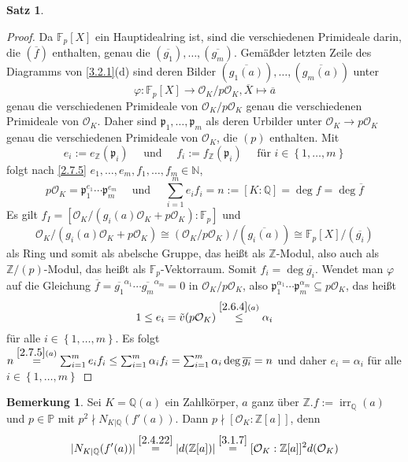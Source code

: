 \documentclass[
twoside=semi,
fontsize=12,
DIV=12, 
cleardoublepage=current,
leqno,
headings=optiontoheadandtoc, 
toc=idx
]{scrbook}
\newcommand{\N}{\mathbb{N}}
\newcommand{\Z}{\mathbb{Z}}
\newcommand{\Q}{\mathbb{Q}}
\newcommand{\F}{\mathbb{F}}
\renewcommand{\P}{\mathbb{P}}
\newcommand{\set}[1]{\left\{ #1 \right\}}
\DeclareMathOperator{\irr}{irr}
\theoremstyle{definition}
\newtheorem{bemerkung}[definition]{Bemerkung}
\newtheorem{satz}[definition]{Satz}
\begin{document}
\begin{satz}
		\begin{proof}
			Da $\F_p[X]$ ein Hauptidealring ist, sind die verschiedenen Primideale darin, die $(\overline{f})$ enthalten, genau die $(\overline{g_1}), \dots, (\overline{g_m})$. Gem\"a\ss der letzten Zeile des Diagramms von \ref{3.2.1}(d) sind deren Bilder $(\overline{g_1(a)}), \dots, (\overline{g_m(a)})$ unter
				\[\varphi: \F_p[X] \to \mathcal{O}_K/p\mathcal{O}_K, \overline{X} \mapsto \overline{a}\]
			genau die verschiedenen Primideale von $\mathcal{O}_K/p\mathcal{O}_K$ genau die verschiedenen Primideale von $\mathcal{O}_K$. Daher sind $\mathfrak{p}_1, \dots, \mathfrak{p}_m$ als deren
			Urbilder unter $\mathcal{O}_K \to p\mathcal{O}_K$ genau die verschiedenen Primideale von $\mathcal{O}_K$, die $(p)$ enthalten. Mit
				\[e_i := e_\Z(\mathfrak{p}_i) \quad \textrm{ und } \quad f_i := f_\Z(\mathfrak{p}_i) \quad \textrm{ f\"ur } i \in \set{1, \dots, m}\]
			folgt nach \ref{2.7.5} $e_1, \dots, e_m, f_1, \dots, f_m \in \N$,
				\[p\mathcal{O}_K = \mathfrak{p}_1^{e_1} \cdots \mathfrak{p}_m^{e_m} \quad\textrm{ und }\quad \sum_{i=1}^m e_if_i = n := [K:\Q] = \deg f = \deg \overline{f}\]
			 Es gilt $f_I = [\mathcal{O}_K/(g_i(a)\mathcal{O}_K + p\mathcal{O}_K):\F_p]$ und  
			 	\[\mathcal{O}_K/(g_i(a)\mathcal{O}_K + p\mathcal{O}_K) \cong (\mathcal{O}_K/p\mathcal{O}_K)/(\overline{g_i(a)}) \cong \F_p[X]/(\overline{g_i})\]
			 als Ring und somit als abelsche Gruppe, das hei\ss t als $\Z$-Modul, also auch als \linebreak $\Z/(p)$-Modul, das hei\ss t als $\F_p$-Vektorraum. Somit $f_i = \deg \overline{g_i}$.
			 Wendet man $\varphi$ auf die Gleichung $\overline{f} = \overline{g_1}^{\alpha_1}\cdots \overline{g_m}^{\alpha_m} = 0$ in $\mathcal{O}_K/p\mathcal{O}_K$, also $\mathfrak{p}_1^{\alpha_1}\cdots \mathfrak{p}_m^{\alpha_m} \subseteq p\mathcal{O}_K$, das hei\ss t
			 	\[1 \leq e_i = \tilde{v}(p\mathcal{O}_K) \overset{\ref{2.6.4}(a)}{\leq} \alpha_i\]
			 f\"ur alle $i \in \set{1, \dots, m}$. Es folgt $n \overset{\ref{2.7.5}(a)}{=} \sum_{i=1}^m e_if_i \leq \sum_{i=1}^m \alpha_if_i = \sum_{i=1}^m \alpha_i\deg \overline{g_i} = n$ und daher $e_i = \alpha_i$ f\"ur alle $i \in \set{1, \dots, m}$
		\end{proof}
	\end{satz}

	\begin{bemerkung}\label{3.2.3}\hfill\newline
		Sei $K=\Q(a)$ ein Zahlk\"orper, $a$ ganz \"uber $\Z. f:= \irr_\Q(a)$ und $p \in \P$ mit $p^2\nmid N_{K|\Q}(f'(a))$. Dann $p\nmid [\mathcal{O}_K:\Z[a]]$, denn
			\[|N_{K|\Q}(f'(a))| \overset{\ref{2.4.22}}{=} |d(\Z[a])| \overset{\ref{3.1.7}}{=} [\mathcal{O}_K:\Z[a]]^2d(\mathcal{O}_K)\]
	\end{bemerkung}
\end{document}
